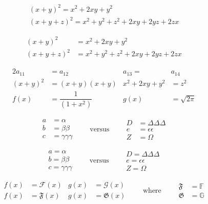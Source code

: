 \documentclass[11pt]{article}
\begin{document}
\begin{gather}
(x+y)^2 = x^2 +2xy + y^2 \\
(x+y+z)^2 = x^2 + y^2 + z^2 + 2xy + 2yz + 2zx
\end{gather}

\begin{align}
(x+y)^2 &= x^2 + 2xy + y^2 \\
(x+y+z)^2 &= x^2 + y^2 + z^2 + 2xy + 2yz + 2zx 
\end{align}

\begin{alignat}{2}
a_{11} &= a_{12} & a_{13}= & a_{14} \\
(x+y)^2 &= (x+y)(x+y) & x^2+2xy+y^2 &= z^2 \\
f(x) &= \dfrac{1}{(1+x^2)} & g(x) &= \sqrt{2\pi}
\end{alignat}

\begin{equation}
\begin{aligned}
a &= \alpha \\
b &= \beta\beta \\
c &= \gamma\gamma\gamma
\end{aligned}
\qquad \text{versus} \qquad
\begin{aligned}
D &= \Delta\Delta\Delta \\
e &= \epsilon\epsilon \\
Z &= \Omega
\end{aligned}
\end{equation}

\begin{equation} \label{eq:gathered}
\begin{gathered}
a = \alpha \\
b = \beta\beta \\
c = \gamma\gamma\gamma 
\end{gathered}
\qquad \text{versus} \qquad
\begin{gathered}
D = \Delta\Delta\Delta \\
e = \epsilon\epsilon \\
Z = \Omega
\end{gathered}
\end{equation}

\begin{equation}
\begin{alignedat}{2}
f(x) &= \mathcal{F}(x) & g(x) &= \mathcal{G}(x) \\
f(x) &= \mathfrak{F}(x) & g(x) &= \mathfrak{G}(x)
\end{alignedat}
\qquad \text{where} \qquad
\begin{alignedat}{1}
\mathfrak{F} &= \mathbb{F} \\
\mathfrak{G} &= \mathbb{G}
\end{alignedat}
\end{equation}
\end{document}
